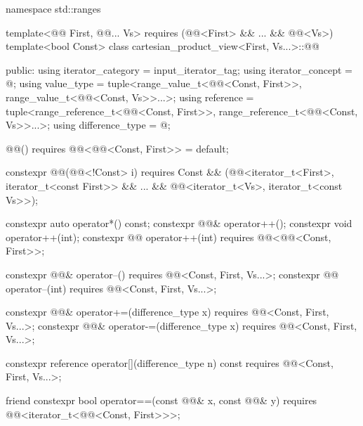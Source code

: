 \begin{codeblock}
namespace std::ranges {
  template<@@ First, @@... Vs>
    requires (@@<First> && ... && @@<Vs>)
  template<bool Const>
  class cartesian_product_view<First, Vs...>::@@ {
  public:
    using iterator_category = input_iterator_tag;
    using iterator_concept  = @\seebelow@;
    using value_type = tuple<range_value_t<@@<Const, First>>,
      range_value_t<@@<Const, Vs>>...>;
    using reference = tuple<range_reference_t<@@<Const, First>>,
      range_reference_t<@@<Const, Vs>>...>;
    using difference_type = @\seebelow@;

    @@() requires @@<@@<Const, First>> = default;

    constexpr @@(@@<!Const> i) requires Const &&
      (@@<iterator_t<First>, iterator_t<const First>> &&
        ... && @@<iterator_t<Vs>, iterator_t<const Vs>>);

    constexpr auto operator*() const;
    constexpr @@& operator++();
    constexpr void operator++(int);
    constexpr @@ operator++(int) requires @@<@@<Const, First>>;

    constexpr @@& operator--()
      requires @@<Const, First, Vs...>;
    constexpr @@ operator--(int)
      requires @@<Const, First, Vs...>;

    constexpr @@& operator+=(difference_type x)
      requires @@<Const, First, Vs...>;
    constexpr @@& operator-=(difference_type x)
      requires @@<Const, First, Vs...>;

    constexpr reference operator[](difference_type n) const
      requires @@<Const, First, Vs...>;

    friend constexpr bool operator==(const @@& x, const @@& y)
      requires @@<iterator_t<@@<Const, First>>>;

}}
\end{codeblock}
